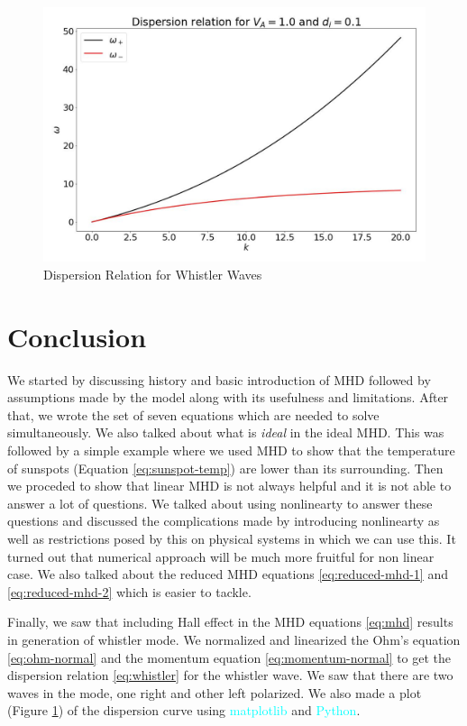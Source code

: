 \documentclass[12pt]{article}
\newenvironment{changemargin}[2]{
\begin{list}{}{
\setlength{\topsep}{0pt}
\setlength{\leftmargin}{#1}
\setlength{\rightmargin}{#2}
\setlength{\listparindent}{\parindent}
\setlength{\itemindent}{\parindent}
\setlength{\parsep}{\parskip}
}
\item[]}{\end{list}}
\begin{document}
\begin{changemargin}{-2cm}{-2cm}
    \begin{figure}[h]
        \includegraphics[width=1.0\textwidth, height=0.78\textwidth]{dispersion.jpg}
        \caption{Dispersion Relation for Whistler Waves}
        \label{fig:whistler}
    \end{figure}
    \section{Conclusion}
    We started by discussing history and basic introduction of MHD followed by assumptions made by the model along with its usefulness and limitations. After that, we wrote the set of seven equations which are needed to solve simultaneously. We also talked about what is \textit{ideal} in the ideal MHD. This was followed by a simple example where we used MHD to show that the temperature of sunspots (Equation \ref{eq:sunspot-temp}) are lower than its surrounding. Then we proceded to show that linear MHD is not always helpful and it is not able to answer a lot of questions. We talked about using nonlinearty to answer these questions and discussed the complications made by introducing nonlinearty as well as restrictions posed by this on physical systems in which we can use this. It turned out that numerical approach will be much more fruitful for non linear case. We also talked about the reduced MHD equations \ref{eq:reduced-mhd-1} and \ref{eq:reduced-mhd-2} which is easier to tackle.

    Finally, we saw that including Hall effect in the MHD equations \ref{eq:mhd} results in generation of whistler mode. We normalized and linearized the Ohm's equation \ref{eq:ohm-normal} and the momentum equation \ref{eq:momentum-normal} to get the dispersion relation \ref{eq:whistler} for the whistler wave. We saw that there are two waves in the mode, one right and other left polarized. We also made a plot (Figure \ref{fig:whistler}) of the dispersion curve using \textcolor{cyan}{matplotlib} and \textcolor{cyan}{Python}.
    \printbibliography
\end{changemargin}
\end{document}
